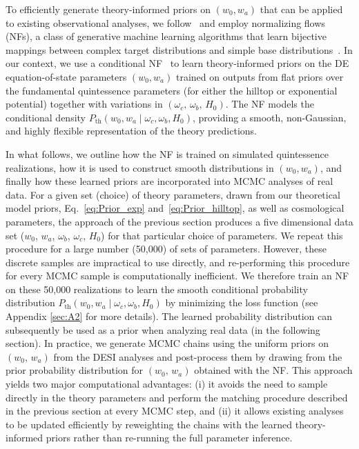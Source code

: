 \documentclass[floats,floatfix,showpacs,amssymb,prd,twocolumn,superscriptaddress,nofootinbib,reprint,preprintnumbers]{revtex4-2}
\begin{document}
\noindent 

To efficiently generate theory-informed priors on $(w_0, w_a)$ that can be applied to existing observational analyses, we follow~\cite{Toomey:2024ita} and employ normalizing flows (NFs), a class of generative machine learning algorithms that learn bijective mappings between complex target distributions and simple base distributions~\cite{nfs}. In our context, we use a conditional NF~\cite{2015arXiv150505770J, 2017arXiv170507057P}
 to learn theory-informed priors on the DE equation-of-state parameters $(w_0, w_a)$   trained on outputs from flat priors over the fundamental quintessence parameters (for either the hilltop or exponential potential) together with variations in $(\omega_c,\,\omega_b, \,H_0)$. The NF models the conditional density $P_{\mathrm{th}}(w_0, w_a \mid \omega_c, \omega_b, H_0)$, providing a smooth, non-Gaussian, and highly flexible representation of the theory predictions. 
 
 In what follows, we outline how the NF is trained on simulated quintessence realizations, how it is used to construct smooth distributions in $(w_0, w_a)$, and finally how these learned priors are incorporated into MCMC analyses of real data. For a given set (choice) of theory parameters, drawn from our
theoretical model priors, Eq.~\eqref{eq:Prior_exp} and~\eqref{eq:Prior_hilltop}, as well as cosmological parameters, the approach of the previous section produces a five dimensional data set ($w_0$, $w_a$, $\omega_b$, $\omega_c$, $H_0$) for that particular choice of parameters. We repeat this procedure for a large number (50,000) of sets of parameters. However, these discrete samples are impractical to use directly, and re-performing this procedure for every MCMC sample is computationally inefficient. We therefore train an NF on these 50,000 realizations to learn the smooth conditional probability distribution $P_{\mathrm{th}}(w_0, w_a \mid \omega_c, \omega_b, H_0)$ by minimizing the loss function (see Appendix \ref{sec:A2} for more details). The learned  probability distribution can subsequently be used as a prior when analyzing real data (in the following section). In practice, we generate MCMC chains using the uniform priors on $(w_0,\, w_a)$ from the DESI analyses and post-process them by drawing from the prior probability distribution for $(w_0,\,w_a)$ obtained with the NF. This approach yields two major computational advantages: (i) it avoids the need to sample directly in the theory parameters and perform the matching procedure described in the previous section at every MCMC step, and (ii) it allows existing analyses to be updated efficiently by reweighting the chains with the learned theory-informed priors rather than re-running the full parameter inference.
\end{document}

